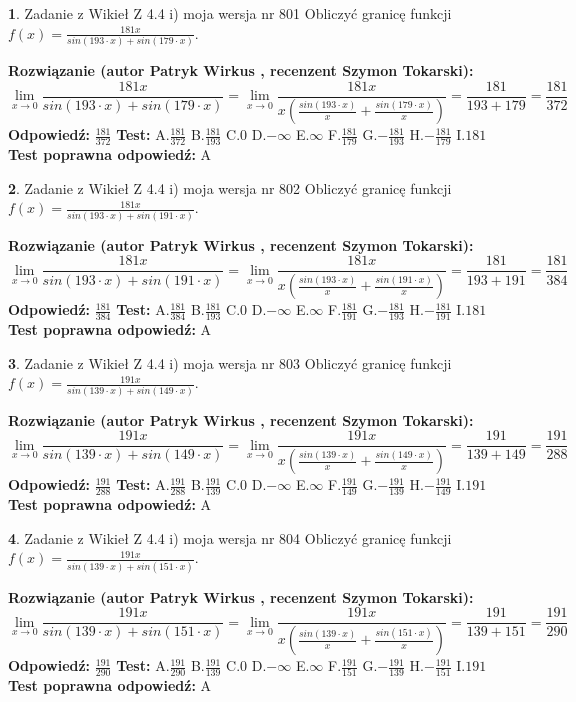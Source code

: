 \documentclass[12pt, a4paper]{article}
\theoremstyle{definition} %
\newtheorem{zad}{}
\newcommand{\zadStart}[1]{\begin{zad}#1\newline}
\newcommand{\zadStop}{\end{zad}}
\newcommand{\rozwStart}[2]{\noindent \textbf{Rozwiązanie (autor #1 , recenzent #2): }\newline}
\newcommand{\rozwStop}{\newline}
\newcommand{\odpStart}{\noindent \textbf{Odpowiedź:}\newline}
\newcommand{\odpStop}{\newline}
\newcommand{\testStart}{\noindent \textbf{Test:}\newline}
\newcommand{\testStop}{\newline}
\newcommand{\kluczStart}{\noindent \textbf{Test poprawna odpowiedź:}\newline}
\newcommand{\kluczStop}{\newline}
\begin{document}
\zadStart{Zadanie z Wikieł Z 4.4 i) moja wersja nr 801}
Obliczyć granicę funkcji $f(x)=\frac{181x}{sin(193\cdot x) +sin(179\cdot x)}$.
\zadStop
\rozwStart{Patryk Wirkus}{Szymon Tokarski}
$$\lim\limits_{x\to 0}\frac{181x}{sin(193\cdot x) +sin(179\cdot x)}=\lim\limits_{x\to 0}\frac{181x}{x(\frac{sin(193\cdot x)}{x}+\frac{sin(179\cdot x)}{x})}=\frac{181}{193+179} = \frac{181}{372}$$
\rozwStop
\odpStart
$\frac{181}{372}$
\odpStop
\testStart
A.$\frac{181}{372}$
B.$\frac{181}{193}$
C.$0$
D.$-\infty$
E.$\infty$
F.$\frac{181}{179}$
G.$-\frac{181}{193}$
H.$-\frac{181}{179}$
I.$181$
\testStop
\kluczStart
A
\kluczStop



\zadStart{Zadanie z Wikieł Z 4.4 i) moja wersja nr 802}
Obliczyć granicę funkcji $f(x)=\frac{181x}{sin(193\cdot x) +sin(191\cdot x)}$.
\zadStop
\rozwStart{Patryk Wirkus}{Szymon Tokarski}
$$\lim\limits_{x\to 0}\frac{181x}{sin(193\cdot x) +sin(191\cdot x)}=\lim\limits_{x\to 0}\frac{181x}{x(\frac{sin(193\cdot x)}{x}+\frac{sin(191\cdot x)}{x})}=\frac{181}{193+191} = \frac{181}{384}$$
\rozwStop
\odpStart
$\frac{181}{384}$
\odpStop
\testStart
A.$\frac{181}{384}$
B.$\frac{181}{193}$
C.$0$
D.$-\infty$
E.$\infty$
F.$\frac{181}{191}$
G.$-\frac{181}{193}$
H.$-\frac{181}{191}$
I.$181$
\testStop
\kluczStart
A
\kluczStop



\zadStart{Zadanie z Wikieł Z 4.4 i) moja wersja nr 803}
Obliczyć granicę funkcji $f(x)=\frac{191x}{sin(139\cdot x) +sin(149\cdot x)}$.
\zadStop
\rozwStart{Patryk Wirkus}{Szymon Tokarski}
$$\lim\limits_{x\to 0}\frac{191x}{sin(139\cdot x) +sin(149\cdot x)}=\lim\limits_{x\to 0}\frac{191x}{x(\frac{sin(139\cdot x)}{x}+\frac{sin(149\cdot x)}{x})}=\frac{191}{139+149} = \frac{191}{288}$$
\rozwStop
\odpStart
$\frac{191}{288}$
\odpStop
\testStart
A.$\frac{191}{288}$
B.$\frac{191}{139}$
C.$0$
D.$-\infty$
E.$\infty$
F.$\frac{191}{149}$
G.$-\frac{191}{139}$
H.$-\frac{191}{149}$
I.$191$
\testStop
\kluczStart
A
\kluczStop



\zadStart{Zadanie z Wikieł Z 4.4 i) moja wersja nr 804}
Obliczyć granicę funkcji $f(x)=\frac{191x}{sin(139\cdot x) +sin(151\cdot x)}$.
\zadStop
\rozwStart{Patryk Wirkus}{Szymon Tokarski}
$$\lim\limits_{x\to 0}\frac{191x}{sin(139\cdot x) +sin(151\cdot x)}=\lim\limits_{x\to 0}\frac{191x}{x(\frac{sin(139\cdot x)}{x}+\frac{sin(151\cdot x)}{x})}=\frac{191}{139+151} = \frac{191}{290}$$
\rozwStop
\odpStart
$\frac{191}{290}$
\odpStop
\testStart
A.$\frac{191}{290}$
B.$\frac{191}{139}$
C.$0$
D.$-\infty$
E.$\infty$
F.$\frac{191}{151}$
G.$-\frac{191}{139}$
H.$-\frac{191}{151}$
I.$191$
\testStop
\kluczStart
A
\kluczStop
\end{document}
